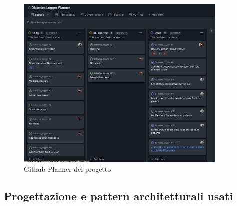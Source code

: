 \documentclass[a4paper]{article}
\newcommand{\mycomment}[1]{}
\begin{document}
\begin{figure}[H]
  \begin{center}
    \includegraphics[width=0.9\textwidth]{githubPlanner.png}
  \end{center}
  \caption{Github Planner del progetto} 
  \label{fig:githubPlanner}
\end{figure}

\subsection{Progettazione e pattern architetturali usati}

\mycomment{ Il software è stato progettato seguendo il pattern architetturale \textit{Model-View-Controller} 
(MVC), che separa la logica di business, la presentazione e la gestione degli eventi.
Questo tipo di pattern ci ha permesso di mantenere il codice ben organizzato e facilmente manutenibile.
Abbiamo scelto questo pattern poiché \textit{Spring Boot} (framework di Java utilizzato per il backend) ha gli strumenti necessari
per implementare questo pattern in modo semplice e veloce:
\begin{itemize}
  \item \textbf{Model}: rappresenta la logica di business e i dati del software. 
  In questo caso, il model è composto da classi che rappresentano lo user, i pazienti, i medici, 
  le rilevazioni, le notifiche e il change log. 
  \item \textbf{View}: rappresenta la parte di presentazione del software. In questo caso, 
  la view è composta da pagine costruite con SvelteKit, un framework per fare siti web. 
  \item \textbf{Controller}: rappresenta la parte di gestione degli eventi e della logica di business. 
  Risponde alle chiamate e alle sollecitazioni della View e gestisce le richieste degli utenti.
\end{itemize}
Tramite richieste HTTP, il controllera comunica con il model e la view. 
Quindi il controller riceve la richiesta dalla view e poi interagisce con il model per 
ottenere i dati necessari oppure modificarli in base alla richiesta dell'utente.
Nelle prossime sezioni verrà analizzato in dettaglio il modello Model poiché contiene 
le classi che rappresentano gli attori del sistema e le loro interazioni.
}
\end{document}
